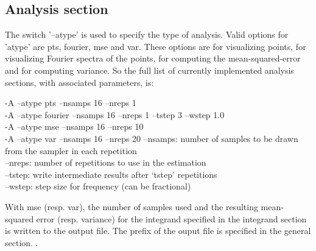 \subsection{Analysis section}
The switch '--atype' is used to specify the type of analysis. Valid options for 'atype' are pts, fourier, mse and var. These options are for visualizing points, for visualizing Fourier spectra of the points, for computing the mean-squared-error and for computing variance. So the full list of currently implemented analysis sections, with associated parameters, is:
\begin{tcolorbox}
  -A --atype pts --nsamps 16 --nreps 1 \\
  -A --atype fourier --nsamps 16 --nreps 1 --tstep 3 --wstep 1.0 \\
  -A --atype mse --nsamps 16 --nreps 10 \\
  -A --atype var --nsamps 16 --nreps 20 
  \tcblower
    --nsamps: number of samples to be drawn from the sampler in each repetition \\
    --nreps: number of repetitions to use in the estimation \\
    --tstep: write intermediate results after `tstep' repetitions \\
    --wstep: step size for frequency (can be fractional) 
\end{tcolorbox}
With mse (resp. var), the number of samples used and the resulting mean-squared error (resp. variance) for the integrand specified in the integrand section is written to the output file. The prefix of the ouput file is specified in the general section.
.

